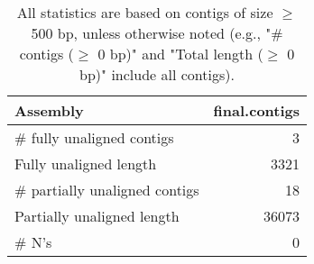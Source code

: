 \documentclass[12pt,a4paper]{article}
\begin{document}
\begin{table}[ht]
\begin{center}
\caption{All statistics are based on contigs of size $\geq$ 500 bp, unless otherwise noted (e.g., "\# contigs ($\geq$ 0 bp)" and "Total length ($\geq$ 0 bp)" include all contigs).}
\begin{tabular}{|l*{1}{|r}|}
\hline
Assembly & final.contigs \\ \hline
\# fully unaligned contigs & 3 \\ \hline
Fully unaligned length & 3321 \\ \hline
\# partially unaligned contigs & 18 \\ \hline
Partially unaligned length & 36073 \\ \hline
\# N's & 0 \\ \hline
\end{tabular}
\end{center}
\end{table}
\end{document}

